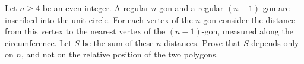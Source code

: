 Let $n\ge 4$ be an even integer. A regular $n$-gon and a regular $(n-1)$-gon are inscribed into the unit circle. For each vertex of the $n$-gon consider the distance from this vertex to the nearest vertex of the $(n-1)$-gon, measured along the circumference. Let $S$ be the sum of these $n$ distances. Prove that $S$ depends only on $n$,  and not on the relative position of the two polygons.